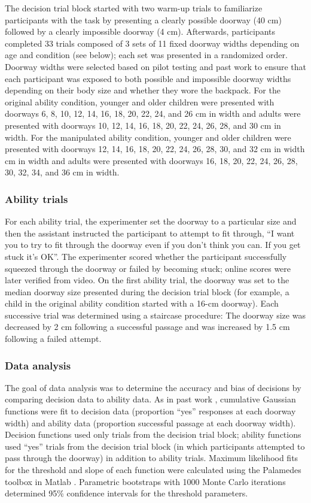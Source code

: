 \documentclass[a4paper,man,natbib,floatsintext,noextraspace]{apa6}
\begin{document}
The decision trial block started with two warm-up trials to familiarize participants with the task by presenting a clearly possible doorway (40 cm) followed by a clearly impossible doorway (4 cm). Afterwards, participants completed 33 trials composed of 3 sets of 11 fixed doorway widths depending on age and condition (see below); each set was presented in a randomized order. Doorway widths were selected based on pilot testing and past work \citep{Recal} to ensure that each participant was exposed to both possible and impossible doorway widths depending on their body size and whether they wore the backpack. For the original ability condition, younger and older children were presented with doorways 6, 8, 10, 12, 14, 16, 18, 20, 22, 24, and 26 cm in width and adults were presented with doorways 10, 12, 14, 16, 18, 20, 22, 24, 26, 28, and 30 cm in width. For the manipulated ability condition, younger and older children were presented with doorways 12, 14, 16, 18, 20, 22, 24, 26, 28, 30, and 32 cm in width cm in width and adults were presented with doorways 16, 18, 20, 22, 24, 26, 28, 30, 32, 34, and 36 cm in width. 

\subsubsection{Ability trials}

For each ability trial, the experimenter set the doorway to a particular size and then the assistant instructed the participant to attempt to fit through, “I want you to try to fit through the doorway even if you don’t think you can. If you get stuck it’s OK”. The experimenter scored whether the participant successfully squeezed through the doorway or failed by becoming stuck; online scores were later verified from video. On the first ability trial, the doorway was set to the median doorway size presented during the decision trial block (for example, a child in the original ability condition started with a 16-cm doorway). Each successive trial was determined using a staircase procedure: The doorway size was decreased by 2 cm following a successful passage and was increased by 1.5 cm following a failed attempt.

\subsubsection{Data analysis}

The goal of data analysis was to determine the accuracy and bias of decisions by comparing decision data to ability data. As in past work \citep{Recal,PregAps}, cumulative Gaussian functions were fit to decision data (proportion “yes” responses at each doorway width) and ability data (proportion successful passage at each doorway width). Decision functions used only trials from the decision trial block; ability functions used “yes” trials from the decision trial block (in which participants attempted to pass through the doorway) in addition to ability trials. Maximum likelihood fits for the threshold and slope of each function were calculated using the Palamedes toolbox \citep{KingdomPrins}in Matlab . Parametric bootstraps with 1000 Monte Carlo iterations determined 95\% confidence intervals for the threshold parameters. 
\end{document}
